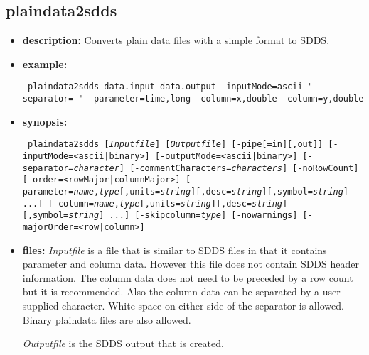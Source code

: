 %
\newpage
\subsection{plaindata2sdds}
\label{plaindata2sdds}

\begin{itemize}
\item {\bf description:} Converts plain data files with a simple format to SDDS.
\item {\bf example:} 
\begin{flushleft}{\tt
plaindata2sdds data.input data.output -inputMode=ascii "-separator= " -parameter=time,long -column=x,double -column=y,double
}\end{flushleft}
\item {\bf synopsis:}
\begin{flushleft}{\tt
plaindata2sdds [{\em Inputfile}] [{\em Outputfile}] [-pipe[=in][,out]] 
[-inputMode=<ascii|binary>]
[-outputMode=<ascii|binary>]
[-separator={\em character}]
[-commentCharacters={\em characters}]
[-noRowCount]
[-order=<rowMajor|columnMajor>]
[-parameter={\em name},{\em type}[,units={\em string}][,desc={\em string}][,symbol={\em string}] ...]
[-column={\em name},{\em type}[,units={\em string}][,desc={\em string}][,symbol={\em string}] ...]
[-skipcolumn={\em type}]
[-nowarnings]
[-majorOrder=<row|column>]
}\end{flushleft}
\item {\bf files: }
{\em Inputfile} is a file that is similar to SDDS files in that it contains parameter and column data. However this file does not contain SDDS header information. The column data does not need to be preceded by a row count but it is recommended. Also the column data can be separated by a user supplied character. White space on either side of the separator is allowed. Binary plaindata files are also allowed.

{\em Outputfile} is the SDDS output that is created.


\end{itemize}
